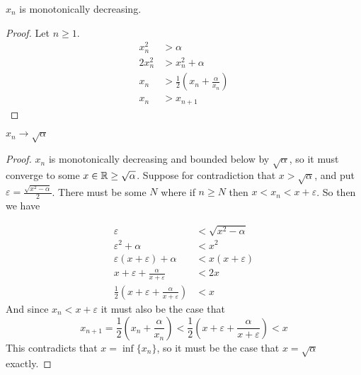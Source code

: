 \documentclass{article}
\begin{document}
\begin{enumerate}
\begin{enumerate}[a.]
\claim $x_n$ is monotonically decreasing.
\begin{proof}
Let $n \geq 1$.
\begin{equation*}
\begin{split}
 x_n^2 &> \alpha \\
2x_n^2 &> x_n^2 + \alpha \\
   x_n &> \frac{1}{2} \left(x_n + \frac{\alpha}{x_n}\right) \\
   x_n &> x_{n+1}
\end{split}
\end{equation*}
\end{proof}

\claim $x_n \to \sqrt{\alpha}$
\begin{proof}
$x_n$ is monotonically decreasing and bounded below by $\sqrt{\alpha}$, so it
must converge to some $x \in \mathbb{R} \geq \sqrt{\alpha}$. Suppose for contradiction
that $x > \sqrt{\alpha}$, and put $\varepsilon = \frac{\sqrt{x^2 - \alpha}}{2}$.
There must be some $N$ where if $n\geq N$ then $x < x_n < x+\varepsilon$. So
then we have

\begin{equation*}
\begin{split}
\varepsilon &< \sqrt{x^2 - \alpha} \\
\varepsilon^2 + \alpha &< x^2 \\
\varepsilon(x + \varepsilon) + \alpha &< x(x+\varepsilon) \\
x + \varepsilon + \frac{\alpha}{x+\varepsilon} &< 2x \\
\frac{1}{2}\left(x + \varepsilon + \frac{\alpha}{x+\varepsilon}\right) &< x
\end{split}
\end{equation*}
And since $x_n < x + \varepsilon$ it must also be the case that
\begin{equation*}
x_{n+1} = \frac{1}{2}\left(x_n + \frac{\alpha}{x_n}\right)
        < \frac{1}{2}\left(x+\varepsilon + \frac{\alpha}{x+\varepsilon}\right)
        < x
\end{equation*}
This contradicts that $x = \inf\{x_n\}$, so it must be the case that
$x = \sqrt{\alpha}$ exactly.
\end{proof}


\end{enumerate}
\end{enumerate}
\end{document}
